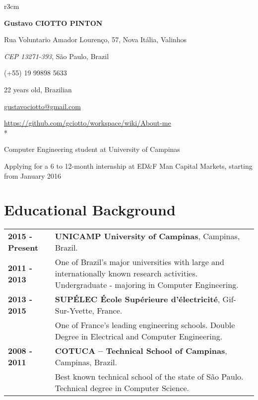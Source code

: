 \documentclass[10pt, a4paper]{article}
\author{Gustavo Ciotto Pinton}
\begin{document}
\pagestyle{empty} 

\begin{wrapfigure}{r}{3cm}
  \vspace{-20pt}
  \begin{center}
  \end{center}
\end{wrapfigure}

\textbf{\LARGE Gustavo CIOTTO PINTON}

Rua Voluntario Amador Lourenço, 57, Nova Itália, Valinhos

\textit{CEP 13271-393}, São Paulo, Brazil

(+55) 19 99898 5633	

22 years old, Brazilian

\url{gustavociotto@gmail.com} 

\url{https://github.com/gciotto/workspace/wiki/About-me}\\*

{\centerline {\large Computer Engineering student at University of Campinas}} 

{\centerline {Applying for a 6 to 12-month internship at ED\&F Man Capital
Markets, starting from January 2016} }



\section{Educational Background}

\begin{tabular}{p{} p{}}

 \textbf{2015 - Present} & \textbf{UNICAMP University of
 Campinas}, Campinas, Brazil.
 \\
 \textbf{2011 - 2013} & One of Brazil’s major universities with large and
 internationally known research activities. Undergraduate -  majoring in
 Computer Engineering.
 \\

 \textbf{2013 - 2015} & \textbf{SUPÉLEC  École Supérieure d'électricité},
 Gif-Sur-Yvette, France. \\
 & One of France's leading engineering schools. Double Degree
 in Electrical and Computer Engineering. \\

 
 \textbf{2008 - 2011} & \textbf{COTUCA – Technical School of Campinas},
 Campinas, Brazil. \\
 & Best known technical school of the state of São Paulo. Technical degree in
 Computer Science.  \\
\end{tabular}
\end{document}
